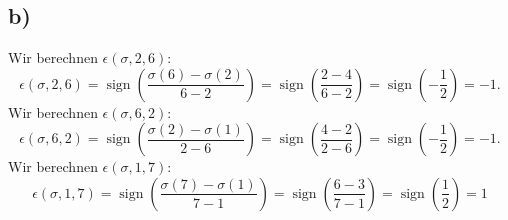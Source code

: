 \documentclass{article}
\DeclareMathOperator{\sign}{sign}
\begin{document}
\subsection*{b)}
Wir berechnen
$\epsilon(\sigma, 2, 6)$:
\[
  \epsilon(\sigma, 2, 6)
  =
  \sign\left(\frac{\sigma(6) - \sigma(2)}{6 - 2}\right)
  =
  \sign\left(\frac{2 - 4}{6 - 2}\right)
  =
  \sign\left(-\frac{1}{2}\right)
  = -1.
\]
Wir berechnen
$\epsilon(\sigma, 6, 2)$:
\[
  \epsilon(\sigma, 6, 2)
  =
  \sign\left(\frac{\sigma(2) - \sigma(1)}{2 - 6}\right)
  =
  \sign\left(\frac{4 - 2}{2 - 6}\right)
  =
  \sign\left(-\frac{1}{2}\right)
  = -1.
\]
Wir berechnen
$\epsilon(\sigma, 1, 7)$:
\[
  \epsilon(\sigma, 1, 7)
  =
  \sign\left(\frac{\sigma(7) - \sigma(1)}{7 - 1}\right)
  =
  \sign\left(\frac{6 - 3}{7 - 1}\right)
  =
  \sign\left(\frac{1}{2}\right)
  = 1
\]
\end{document}

